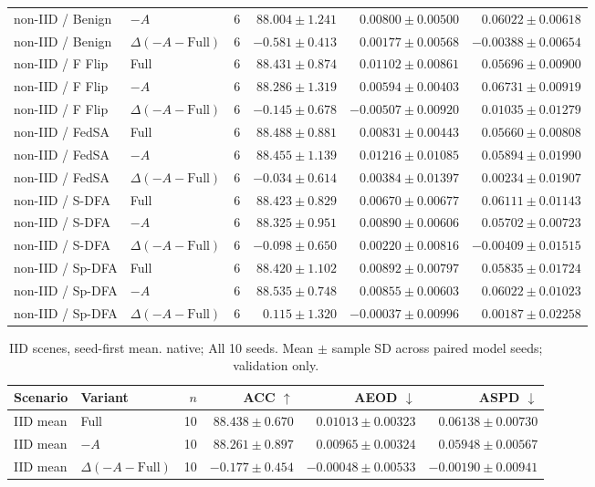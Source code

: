 \begin{table}[t]
\begin{tabular}{llrrrr}
non-IID / Benign & $-A$ & 6 & $88.004 \pm 1.241$ & $0.00800 \pm 0.00500$ & $0.06022 \pm 0.00618$ \\
non-IID / Benign & $\Delta(-A-\mathrm{Full})$ & 6 & $-0.581 \pm 0.413$ & $0.00177 \pm 0.00568$ & $-0.00388 \pm 0.00654$ \\
non-IID / F Flip & Full & 6 & $88.431 \pm 0.874$ & $0.01102 \pm 0.00861$ & $0.05696 \pm 0.00900$ \\
non-IID / F Flip & $-A$ & 6 & $88.286 \pm 1.319$ & $0.00594 \pm 0.00403$ & $0.06731 \pm 0.00919$ \\
non-IID / F Flip & $\Delta(-A-\mathrm{Full})$ & 6 & $-0.145 \pm 0.678$ & $-0.00507 \pm 0.00920$ & $0.01035 \pm 0.01279$ \\
non-IID / FedSA & Full & 6 & $88.488 \pm 0.881$ & $0.00831 \pm 0.00443$ & $0.05660 \pm 0.00808$ \\
non-IID / FedSA & $-A$ & 6 & $88.455 \pm 1.139$ & $0.01216 \pm 0.01085$ & $0.05894 \pm 0.01990$ \\
non-IID / FedSA & $\Delta(-A-\mathrm{Full})$ & 6 & $-0.034 \pm 0.614$ & $0.00384 \pm 0.01397$ & $0.00234 \pm 0.01907$ \\
non-IID / S-DFA & Full & 6 & $88.423 \pm 0.829$ & $0.00670 \pm 0.00677$ & $0.06111 \pm 0.01143$ \\
non-IID / S-DFA & $-A$ & 6 & $88.325 \pm 0.951$ & $0.00890 \pm 0.00606$ & $0.05702 \pm 0.00723$ \\
non-IID / S-DFA & $\Delta(-A-\mathrm{Full})$ & 6 & $-0.098 \pm 0.650$ & $0.00220 \pm 0.00816$ & $-0.00409 \pm 0.01515$ \\
non-IID / Sp-DFA & Full & 6 & $88.420 \pm 1.102$ & $0.00892 \pm 0.00797$ & $0.05835 \pm 0.01724$ \\
non-IID / Sp-DFA & $-A$ & 6 & $88.535 \pm 0.748$ & $0.00855 \pm 0.00603$ & $0.06022 \pm 0.01023$ \\
non-IID / Sp-DFA & $\Delta(-A-\mathrm{Full})$ & 6 & $0.115 \pm 1.320$ & $-0.00037 \pm 0.00996$ & $0.00187 \pm 0.02258$ \\
\bottomrule
\end{tabular}
\end{table}

\begin{table}[t]
\centering
\small
\caption{IID scenes, seed-first mean. native; All 10 seeds. Mean $\pm$ sample SD across paired model seeds; validation only.}
\begin{tabular}{llrrrr}
\toprule
Scenario & Variant & $n$ & ACC $\uparrow$ & AEOD $\downarrow$ & ASPD $\downarrow$ \\
\midrule
IID mean & Full & 10 & $88.438 \pm 0.670$ & $0.01013 \pm 0.00323$ & $0.06138 \pm 0.00730$ \\
IID mean & $-A$ & 10 & $88.261 \pm 0.897$ & $0.00965 \pm 0.00324$ & $0.05948 \pm 0.00567$ \\
IID mean & $\Delta(-A-\mathrm{Full})$ & 10 & $-0.177 \pm 0.454$ & $-0.00048 \pm 0.00533$ & $-0.00190 \pm 0.00941$ \\
\bottomrule
\end{tabular}
\end{table}

